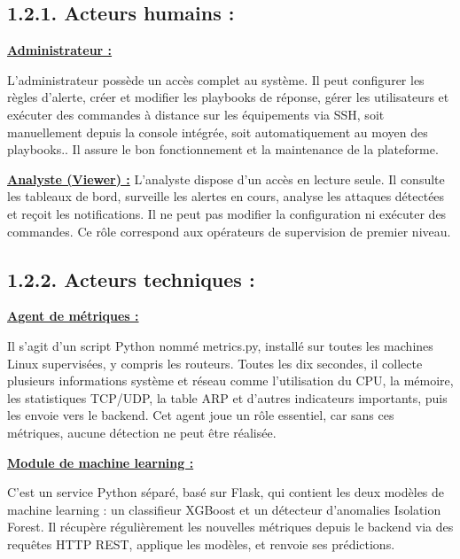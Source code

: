\documentclass[12pt,a4paper]{report}
\newcommand{\ub}[1]{\uline{\textbf{#1}}}
\begin{document}
\subsection*{1.2.1. Acteurs humains :}
\ub{Administrateur :}\par
L’administrateur possède un accès complet au système. Il peut configurer les règles d’alerte, créer et modifier les playbooks de réponse, gérer les utilisateurs et exécuter des commandes à distance sur les équipements via SSH, soit manuellement depuis la console intégrée, soit automatiquement au moyen des playbooks.. Il assure le bon fonctionnement et la maintenance de la plateforme.\par
\ub{Analyste (Viewer) :} L’analyste dispose d’un accès en lecture seule. Il consulte les tableaux de bord, surveille les alertes en cours, analyse les attaques détectées et reçoit les notifications. Il ne peut pas modifier la configuration ni exécuter des commandes. Ce rôle correspond aux opérateurs de supervision de premier niveau.\par
\subsection*{1.2.2. Acteurs techniques :}
\ub{Agent de métriques :}\par
Il s’agit d’un script Python nommé metrics.py, installé sur toutes les machines Linux supervisées, y compris les routeurs. Toutes les dix secondes, il collecte plusieurs informations système et réseau comme l’utilisation  du CPU, la mémoire, les statistiques TCP/UDP, la table ARP et d’autres indicateurs importants, puis les envoie vers le backend. Cet agent joue un rôle essentiel, car sans ces métriques, aucune détection ne peut être réalisée.\par
\ub{Module de machine learning :}\par
C’est un service Python séparé, basé sur Flask, qui contient les deux modèles de machine learning : un classifieur XGBoost et un détecteur d’anomalies Isolation Forest. Il récupère régulièrement les nouvelles métriques depuis le backend via des requêtes HTTP REST, applique les modèles, et renvoie ses prédictions.\par
\end{document}
